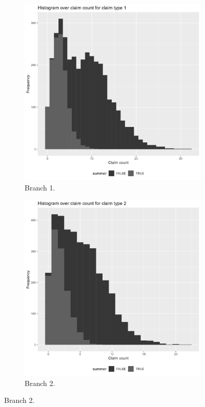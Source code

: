 \documentclass[11pt]{article}
\begin{document}
\begin{figure}[h!]
    \begin{subfigure}{.49\textwidth}
        \centering
        \includegraphics[width=.9\linewidth]{plots/covariance/histogram_claim_count1.png}
        \caption{Branch 1.}
        \label{a3:claimamount}
    \end{subfigure}
    \begin{subfigure}{.49\textwidth}
        \centering
        \includegraphics[width=.9\linewidth]{plots/covariance/histogram_claim_count2.png}
        \caption{Branch 2.}
        \label{a1:histogram}
    \end{subfigure}
\end{figure}
\end{document}
